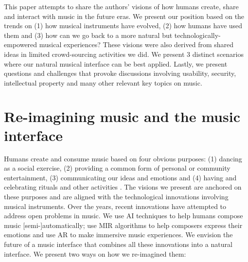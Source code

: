 \documentclass[sigchi]{acmart}
\begin{document}
This paper attempts to share the authors' visions of how humans create, share and interact with music in the future eras. We present our position based on the trends on (1) how musical instruments have evolved, (2) how humans have used them and (3) how can we go back to a more natural but technologically-empowered musical experiences? These visions were also derived from shared ideas in limited crowd-sourcing activities we did. We present 3 distinct scenarios where our natural musical interface can be best applied. Lastly, we present questions and challenges that provoke discussions involving usability, security, intellectual property and many other relevant key topics on music. 


\section{Re-imagining music and the music interface}
Humans create and consume music based on four obvious purposes: (1) dancing as a social exercise, (2) providing a common form of personal or community entertainment, (3) communicating our ideas and emotions and (4) having and celebrating rituals and other activities \cite{montagu2017music}. The visions we present are anchored on these purposes and are aligned with the technological innovations involving musical instruments. Over the years, recent innovations have attempted to address open problems in music. We use AI techniques to help humans compose music [semi-]automatically; use MIR algorithms to help composers express their emotions and use AR to make immersive music experiences. We envision the future of a music interface that combines all these innovations into a natural interface. We present two ways on how we re-imagined them: 
\end{document}
